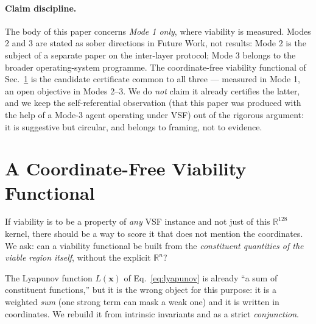 \documentclass[11pt, a4paper]{article}
\newcommand{\R}{\mathbb{R}}
\newcommand{\sv}{\bm{x}}
\begin{document}
\paragraph{Claim discipline.} The body of this paper concerns \emph{Mode 1
only}, where viability is measured. Modes 2 and 3 are stated as sober directions
in Future Work, not results: Mode 2 is the subject of a separate paper on the
inter-layer protocol; Mode 3 belongs to the broader operating-system programme.
The coordinate-free viability functional of Sec.~\ref{sec:capstone} is the
candidate certificate common to all three --- measured in Mode 1, an open
objective in Modes 2--3. We do \emph{not} claim it already certifies the latter,
and we keep the self-referential observation (that this paper was produced with
the help of a Mode-3 agent operating under VSF) out of the rigorous argument: it
is suggestive but circular, and belongs to framing, not to evidence.


\section{A Coordinate-Free Viability Functional}
\label{sec:capstone}

If viability is to be a property of \emph{any} VSF instance and not just of this
$\R^{128}$ kernel, there should be a way to score it that does not mention the
coordinates. We ask: can a viability functional be built from the
\emph{constituent quantities of the viable region itself}, without the explicit
$\R^n$?

The Lyapunov function $L(\sv)$ of Eq.~\eqref{eq:lyapunov} is already ``a sum of
constituent functions,'' but it is the wrong object for this purpose: it is a
weighted \emph{sum} (one strong term can mask a weak one) and it is written in
coordinates. We rebuild it from intrinsic invariants and as a strict
\emph{conjunction}.
\end{document}
